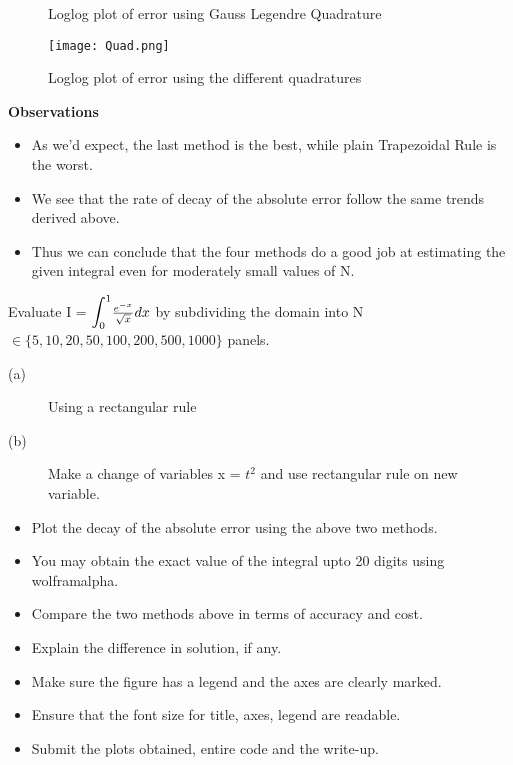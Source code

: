 \documentclass[letterpaper]{exam}
\begin{document}
\begin{questions}
\begin{solution}
\begin{figure}[H]
     \caption{Loglog plot of error using Gauss Legendre Quadrature}
\end{figure}
\begin{figure}[H]  
     \centering
    \texttt{[image: Quad.png]}
     \label{fig:Dendrogram for the problem 3(c)}
     \caption{Loglog plot of error using the different quadratures}
\end{figure}
\textbf{Observations}
\begin{itemize}
    \item As we'd expect, the last method is the best, while plain Trapezoidal Rule is the worst.
    \item We see that the rate of decay of the absolute error follow the same trends derived above.
    \item Thus we can conclude that the four methods do a good job at estimating the given integral even for moderately small values of N.
\end{itemize}
\end{solution}
\question [8] Evaluate I = $\mathlarger{\mathlarger{\int}}_{0}^1 \frac{e^{-x}}{\sqrt{x}} dx$ by subdividing the domain into N $\in  \{5, 10, 20, 50, 100, 200, 500, 1000\} $ panels.
\begin{description}
    \item[(a)] Using a rectangular rule
    \item[(b)]  Make a change of variables x = $t^2$ and use rectangular rule on new variable.
\end{description}
\begin{itemize}
    \item  Plot the decay of the absolute error using the above two methods.
    \item You may obtain the exact value of the integral upto 20 digits using wolframalpha.
    \item Compare the two methods above in terms of accuracy and cost.
    \item Explain the difference in solution, if any.
    \item Make sure the figure has a legend and the axes are clearly marked.
    \item Ensure that the font size for title, axes, legend are readable.
    \item Submit the plots obtained, entire code and the write-up.
\end{itemize}

\end{questions}
\end{document}
